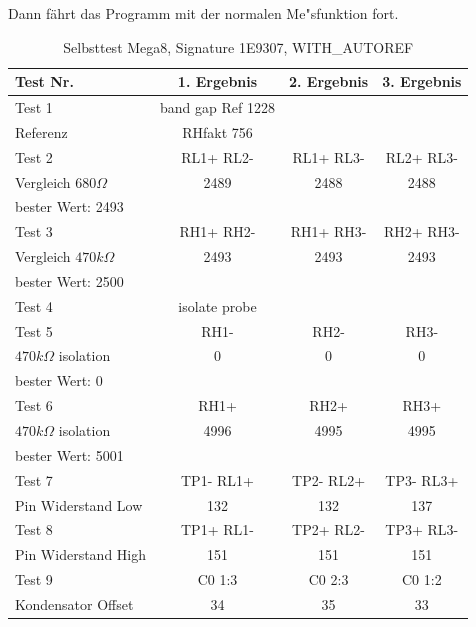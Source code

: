 Dann f\"ahrt das Programm mit der normalen Me"sfunktion fort.

\begin{table}[H]
  \begin{center}
    \begin{tabular}{| l | c | c | c |}
    \hline
Test Nr. & 1. Ergebnis & 2. Ergebnis & 3. Ergebnis \\
    \hline
    \hline
Test 1 & band gap Ref  1228 &  & \\
Referenz  & RHfakt 756 &  &  \\
    \hline
Test 2 & RL1+ RL2- & RL1+ RL3- & RL2+ RL3- \\
Vergleich \(680\Omega\) & 2489 & 2488 & 2488 \\
bester Wert: 2493 & & & \\
    \hline
Test 3 & RH1+ RH2- & RH1+ RH3- & RH2+ RH3- \\
Vergleich \(470k\Omega\) & 2493 & 2493 & 2493 \\
bester Wert: 2500 & & & \\
    \hline
Test 4 & isolate probe & & \\
    \hline
Test 5 & RH1- &  RH2- & RH3- \\
\(470k\Omega\) isolation & 0 & 0 & 0 \\
bester Wert: 0 & & & \\
    \hline
Test 6 & RH1+ & RH2+ & RH3+ \\
\(470k\Omega\) isolation & 4996 & 4995 & 4995 \\
bester Wert: 5001 & & & \\
    \hline
Test 7 & TP1- RL1+ & TP2- RL2+ & TP3- RL3+ \\
Pin Widerstand Low & 132 & 132 & 137 \\
    \hline
Test 8 & TP1+ RL1- & TP2+ RL2- & TP3+ RL3- \\
Pin Widerstand High & 151 & 151 & 151 \\
    \hline
Test 9 & C0  1:3 & C0  2:3 & C0 1:2 \\
Kondensator Offset & 34 & 35 & 33 \\
    \hline
    \end{tabular}
  \end{center}
  \caption{Selbsttest Mega8, Signature 1E9307, WITH\_AUTOREF}
  \label{tab:test_m8} 
\end{table}

